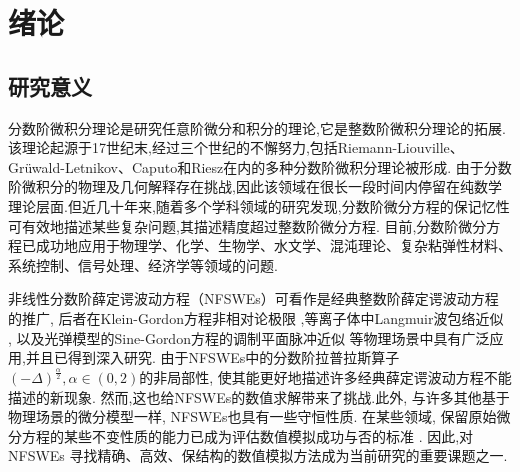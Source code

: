 \chapter[绪论]{绪论}

\section{研究意义}

分数阶微积分理论是研究任意阶微分和积分的理论,它是整数阶微积分理论的拓展.该理论起源于17世纪末,经过三个世纪的不懈努力,包括Riemann-Liouville、Grüwald-Letnikov、Caputo和Riesz在内的多种分数阶微积分理论被形成\cite{samkoFractionalIntegralsDerivatives1993}.
由于分数阶微积分的物理及几何解释存在挑战,因此该领域在很长一段时间内停留在纯数学理论层面.但近几十年来,随着多个学科领域的研究发现,分数阶微分方程的保记忆性可有效地描述某些复杂问题,其描述精度超过整数阶微分方程.
目前,分数阶微分方程已成功地应用于物理学、化学、生物学、水文学、混沌理论、复杂粘弹性材料、系统控制、信号处理、经济学等领域的问题\cite{liIntroductionFractionalCalculus2015,HandbookDifferentialEquations2008,brychkovIndefiniteIntegrals2008,zhangMassBalanceBased2005,carrerasAnomalousDiffusionExit2001,hilferFRACTIONALCALCULUSREGULAR2000,liangRobustnessFractionalorderBoundary2007,maginSolvingFractionalOrder2009,zaslavskySelfsimilarTransportIncomplete1993,sunRandomorderFractionalDifferential2011}.

非线性分数阶薛定谔波动方程（NFSWEs）可看作是经典整数阶薛定谔波动方程的推广,
后者在Klein-Gordon方程非相对论极限 \cite{tsutsumiNonrelativisticApproximationNonlinear1984,machiharaNonrelativisticLimitEnergy2002},等离子体中Langmuir波包络近似 \cite{colinSemidiscretizationTimeNonlinear1998},
以及光弹模型的Sine-Gordon方程的调制平面脉冲近似 \cite{baoComparisonsSineGordonPerturbed2010,xinModelingLightBullets2000}等物理场景中具有广泛应用,并且已得到深入研究\cite{zhangConservativeNumericalScheme2003,baoUniformErrorEstimates2012,chengSeveralConservativeCompact2018,brugnanoClassEnergyconservingHamiltonian2018}.
由于NFSWEs中的分数阶拉普拉斯算子 $(-\Delta)^{\frac{\alpha}{2}}, \alpha \in(0,2)$的非局部性, 使其能更好地描述许多经典薛定谔波动方程不能描述的新现象.
然而,这也给NFSWEs的数值求解带来了挑战.此外, 与许多其他基于物理场景的微分模型一样, NFSWEs也具有一些守恒性质. 
在某些领域, 保留原始微分方程的某些不变性质的能力已成为评估数值模拟成功与否的标准 \cite{liFiniteDifferenceCalculus1995}.
因此,对 NFSWEs 寻找精确、高效、保结构的数值模拟方法成为当前研究的重要课题之一.

